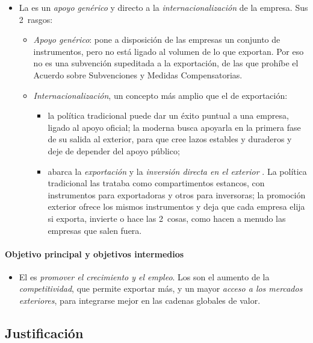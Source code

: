 \documentclass[11pt]{article}
\begin{document}
\begin{itemize}
\item La  es un \emph{apoyo genérico} y directo a la \emph{internacionalización} de la empresa. Sus 2~rasgos:
  \begin{itemize}
  \item \emph{Apoyo genérico}: pone a disposición de las empresas un conjunto de instrumentos, pero no está ligado al volumen de lo que exportan. Por eso no es una subvención supeditada a la exportación, de las que prohíbe el Acuerdo sobre Subvenciones y Medidas Compensatorias\nocite{OMC1994SMC}.
  \item \emph{Internacionalización}, un concepto más amplio que el de exportación:
    \begin{itemize}
    \item la política tradicional puede dar un éxito puntual a una empresa, ligado al apoyo oficial; la moderna busca apoyarla en la primera fase de su salida al exterior, para que cree lazos estables y duraderos y deje de depender del apoyo público;
    \item abarca la \emph{exportación} y la \emph{inversión directa en el exterior} . La política tradicional las trataba como compartimentos estancos, con instrumentos para exportadoras y otros para inversoras; la promoción exterior ofrece los mismos instrumentos y deja que cada empresa elija si exporta, invierte o hace las 2~cosas, como hacen a menudo las empresas que salen fuera.
    \end{itemize}
  \end{itemize}
\end{itemize}

\paragraph{Objetivo principal y objetivos intermedios}

\begin{itemize}
\item El  es \emph{promover el crecimiento y el empleo}. Los  son el aumento de la \emph{competitividad}, que permite exportar más, y un mayor \emph{acceso a los mercados exteriores}, para integrarse mejor en las cadenas globales de valor.
\end{itemize}

\subsection{Justificación}\label{sec:justificacion}
\end{document}
